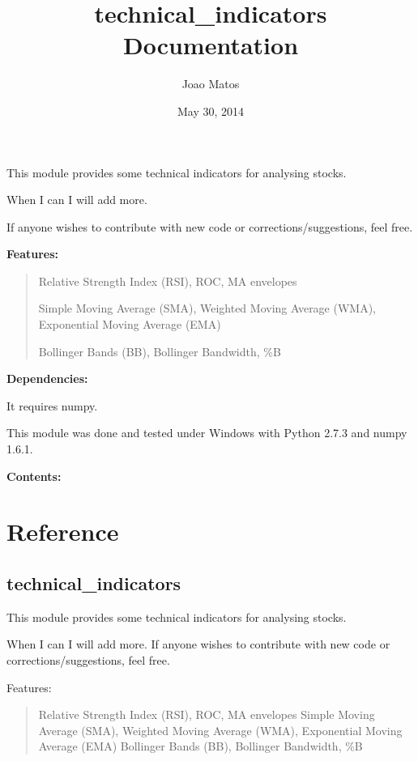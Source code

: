 \documentclass[letterpaper,10pt,english]{sphinxmanual}
\title{technical\_indicators Documentation}
\date{May 30, 2014}
\author{Joao Matos}
\begin{document}
\maketitle
\tableofcontents
{}\label{index::doc}


This module provides some technical indicators for analysing stocks.

When I can I will add more.

If anyone wishes to contribute with new code or corrections/suggestions, feel free.

\textbf{Features:}
\begin{quote}

Relative Strength Index (RSI), ROC, MA envelopes

Simple Moving Average (SMA), Weighted Moving Average (WMA), Exponential Moving Average (EMA)

Bollinger Bands (BB), Bollinger Bandwidth, \%B
\end{quote}

\textbf{Dependencies:}

It requires numpy.

This module was done and tested under Windows with Python 2.7.3 and numpy 1.6.1.

\textbf{Contents:}


\chapter{Reference}
\label{reference:welcome-to-technical-indicators-s-documentation}\label{reference::doc}\label{reference:reference}

\section{technical\_indicators}
\label{reference:technical-indicators}\label{reference:module-technical_indicators.technical_indicators}
This module provides some technical indicators for analysing stocks.

When I can I will add more.
If anyone wishes to contribute with new code or corrections/suggestions, feel
free.

Features:
\begin{quote}

Relative Strength Index (RSI), ROC, MA envelopes
Simple Moving Average (SMA), Weighted Moving Average (WMA), Exponential
Moving Average (EMA)
Bollinger Bands (BB), Bollinger Bandwidth, \%B
\end{quote}
\end{document}
